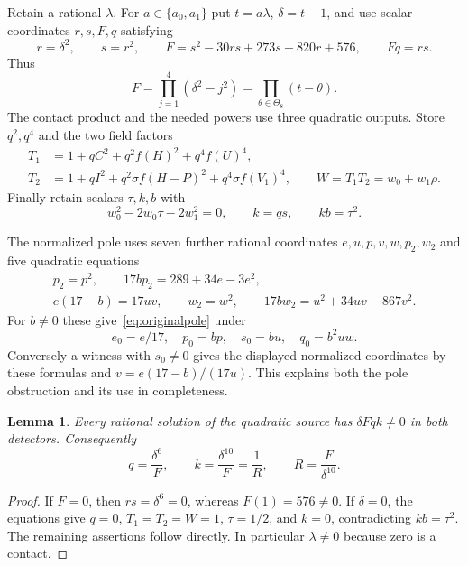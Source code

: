 \documentclass[11pt,a4paper]{article}
\newtheorem{lemma}[theorem]{Lemma}
\begin{document}
Retain a rational $\lambda$. For $a\in\{a_0,a_1\}$ put $t=a\lambda$,
$\delta=t-1$, and use scalar coordinates $r,s,F,q$ satisfying
\begin{equation}\label{eq:contactcircuit}
 r=\delta^2,\qquad s=r^2,\qquad
 F=s^2-30rs+273s-820r+576,\qquad Fq=rs.
\end{equation}
Thus
\[
 F=\prod_{j=1}^4(\delta^2-j^2)
   =\prod_{\theta\in\Theta_8}(t-\theta).
\]
The contact product and the needed powers use three quadratic outputs.
Store $q^2,q^4$ and the two field factors
\begin{equation}\label{eq:packed}
 \begin{split}
 T_1&=1+qC^2+q^2f(H)^2+q^4f(U)^4,\\
 T_2&=1+qI^2+q^2\sigma f(H-P)^2+q^4\sigma f(V_1)^4,
 \qquad W=T_1T_2=w_0+w_1\rho.
 \end{split}
\end{equation}
Finally retain scalars $\tau,k,b$ with
\begin{equation}\label{eq:trace}
             w_0^2-2w_0\tau-2w_1^2=0,\qquad
             k=qs,\qquad kb=\tau^2.
\end{equation}

The normalized pole uses seven further rational coordinates
$e,u,p,v,w,p_2,w_2$ and five quadratic equations
\begin{equation}\label{eq:normalizedpole}
 \begin{gathered}
 p_2=p^2,\qquad 17bp_2=289+34e-3e^2,\\
 e(17-b)=17uv,\qquad w_2=w^2,\qquad
 17bw_2=u^2+34uv-867v^2.
 \end{gathered}
\end{equation}
For $b\ne0$ these give~\eqref{eq:originalpole} under
\[
 e_0=e/17,\quad p_0=bp,\quad s_0=bu,\quad q_0=b^2uw.
\]
Conversely a witness with $s_0\ne0$ gives the displayed normalized
coordinates by these formulas and $v=e(17-b)/(17u)$.
This explains both the pole obstruction and its use in completeness.

\begin{lemma}\label{lem:domain}
Every rational solution of the quadratic source has $\delta Fqk\ne0$
in both detectors. Consequently
\[
 q=\frac{\delta^6}{F},\qquad
 k=\frac{\delta^{10}}F=\frac1R,
 \qquad R=\frac F{\delta^{10}}.
\]
\end{lemma}
\begin{proof}
If $F=0$, then $rs=\delta^6=0$, whereas $F(1)=576\ne0$.
If $\delta=0$, the equations give $q=0$, $T_1=T_2=W=1$,
$\tau=1/2$, and $k=0$, contradicting $kb=\tau^2$.
The remaining assertions follow directly. In particular $\lambda\ne0$
because zero is a contact.
\end{proof}
\end{document}
